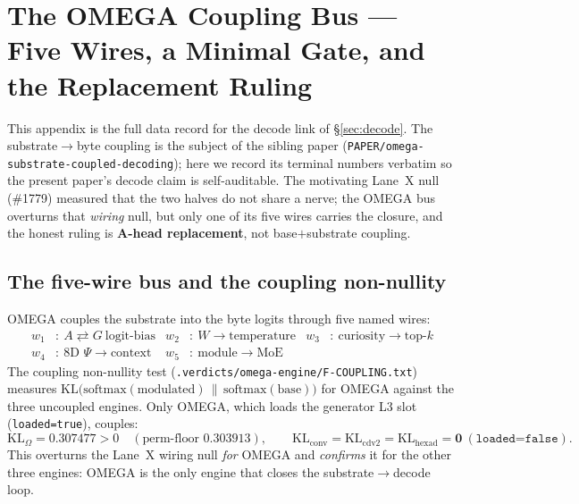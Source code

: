 \section{The OMEGA Coupling Bus --- Five Wires, a Minimal Gate, and the Replacement Ruling}
\label{app:omega_bus}

This appendix is the full data record for the decode link of \S\ref{sec:decode}.
The substrate$\rightarrow$byte coupling is the subject of the sibling paper
(\texttt{PAPER/omega-substrate-coupled-decoding}); here we record its terminal
numbers verbatim so the present paper's decode claim is self-auditable. The
motivating Lane~X null (\#1779) measured that the two halves do not share a
nerve; the OMEGA bus overturns that \emph{wiring} null, but only one of its five
wires carries the closure, and the honest ruling is \textbf{A-head replacement},
not base$+$substrate coupling.

\subsection{The five-wire bus and the coupling non-nullity}
\label{app:omega-bus}

OMEGA couples the substrate into the byte logits through five named wires:
\begin{equation}
\begin{aligned}
w_1&:\ A\rightleftarrows G\ \text{logit-bias} &
w_2&:\ W\rightarrow\text{temperature} &
w_3&:\ \text{curiosity}\rightarrow\text{top-}k \\
w_4&:\ \text{8D }\Psi\rightarrow\text{context} &
w_5&:\ \text{module}\rightarrow\text{MoE} & &
\end{aligned}
\label{eq:omega-wires}
\end{equation}
The coupling non-nullity test (\texttt{.verdicts/omega-engine/F-COUPLING.txt})
measures $\mathrm{KL}\big(\mathrm{softmax}(\text{modulated})\,\|\,
\mathrm{softmax}(\text{base})\big)$ for OMEGA against the three uncoupled
engines. Only OMEGA, which loads the generator L3 slot
(\texttt{loaded=true}), couples:
\begin{equation}
\mathrm{KL}_\Omega = \mathbf{0.307477} > 0
\quad(\text{perm-floor }0.303913),
\qquad
\mathrm{KL}_\text{conv}=\mathrm{KL}_\text{cdv2}=\mathrm{KL}_\text{hexad}=\mathbf{0}\ (\texttt{loaded=false}).
\label{eq:omega-kl}
\end{equation}
This overturns the Lane~X wiring null \emph{for} OMEGA and \emph{confirms} it for
the other three engines: OMEGA is the only engine that closes the
substrate$\rightarrow$decode loop.


